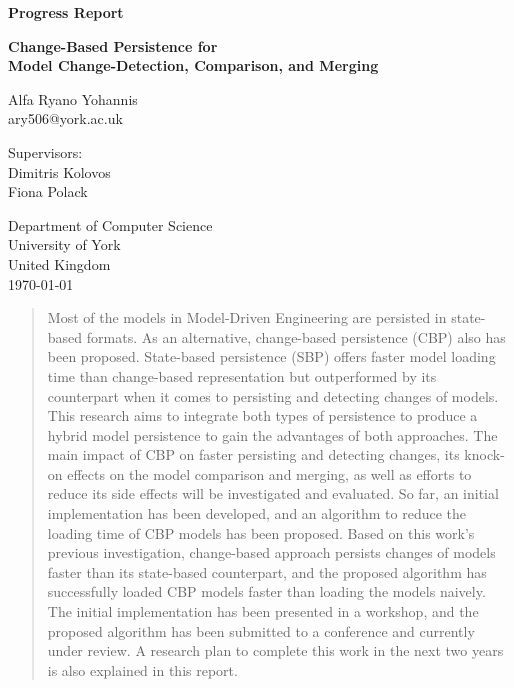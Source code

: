 \documentclass[12pt, a4paper]{report} \usepackage[titletoc]{appendix}
\begin{document}
\begin{titlepage}
 \begin{center}

\textbf{Progress Report}
\vspace{1cm}

\textbf{\large Change-Based Persistence for\\Model Change-Detection, Comparison, and Merging}
\vspace{1cm}

Alfa Ryano Yohannis\\
ary506@york.ac.uk
\vspace{1cm}

Supervisors:\\
Dimitris Kolovos\\
Fiona Polack\\
\vspace{1cm}

Department of Computer Science\\
University of York\\
United Kingdom\\
\vspace{1cm}
\today
 
\vfill
 
\end{center}
\end{titlepage}


\begin{abstract}
Most of the models in Model-Driven Engineering are persisted in state-based formats. As an alternative, change-based persistence (CBP) also has been proposed. State-based persistence (SBP) offers faster model loading time than change-based representation but outperformed by its counterpart when it comes to persisting and detecting changes of models. This research aims to integrate both types of persistence to produce a hybrid model persistence to gain the advantages of both approaches. The main impact of CBP on faster persisting and detecting changes, its knock-on effects on the model comparison and merging, as well as efforts to reduce its side effects will be investigated and evaluated. So far, an initial implementation has been developed, and an algorithm to reduce the loading time of CBP models has been proposed. Based on this work's previous investigation, change-based approach persists changes of models faster than its state-based counterpart, and the proposed algorithm has successfully loaded CBP models faster than loading the models naively. The initial implementation has been presented in a workshop, and the proposed algorithm has been submitted to a conference and currently under review. A research plan to complete this work in the next two years is also explained in this report.
\end{abstract}
\end{document}
